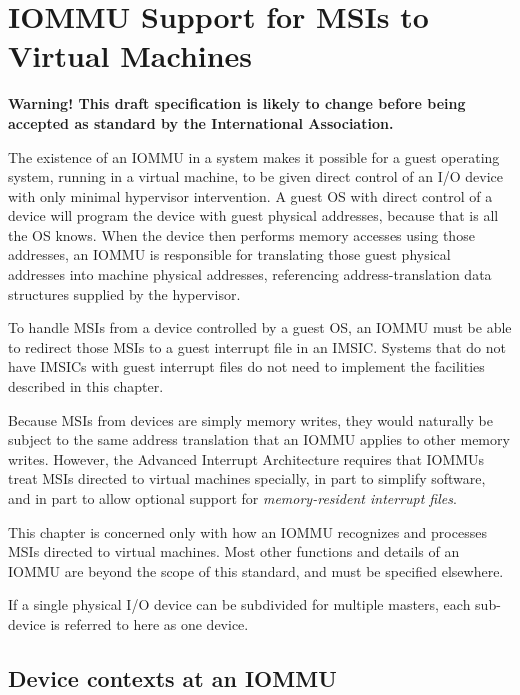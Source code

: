 
\chapter{IOMMU Support for MSIs to Virtual Machines}
\label{ch:IOMMU}

\textbf{%
Warning!
This draft specification is likely to change before being accepted as
standard by the {\RISCV} International Association.%
}
\bigskip

The existence of an \mbox{IOMMU} in a system makes it possible for a guest
operating system, running in a virtual machine, to be given direct
control of an I/O device with only minimal hypervisor intervention.
A guest OS with direct control of a device will program the device with
guest physical addresses, because that is all the OS knows.
When the device then performs memory accesses using those addresses, an
\mbox{IOMMU} is responsible for translating those guest physical addresses
into machine physical addresses, referencing address-translation data
structures supplied by the hypervisor.

To handle MSIs from a device controlled by a guest OS, an \mbox{IOMMU} must
be able to redirect those MSIs to a guest interrupt file in an IMSIC.
Systems that do not have IMSICs with guest interrupt files do not need
to implement the facilities described in this chapter.

Because MSIs from devices are simply memory writes, they would
naturally be subject to the same address translation that an \mbox{IOMMU}
applies to other memory writes.
However, the Advanced Interrupt Architecture requires that \mbox{IOMMU}s
treat MSIs directed to virtual machines specially, in part to
simplify software, and in part to allow optional support for
\emph{memory-resident interrupt files}.

This chapter is concerned only with how an \mbox{IOMMU} recognizes and
processes MSIs directed to virtual machines.
Most other functions and details of an \mbox{IOMMU} are beyond the scope of
this standard, and must be specified elsewhere.

If a single physical I/O device can be subdivided for multiple masters,
each sub-device is referred to here as one device.

\section{Device contexts at an IOMMU}
\label{sec:IOMMU-deviceContexts}

